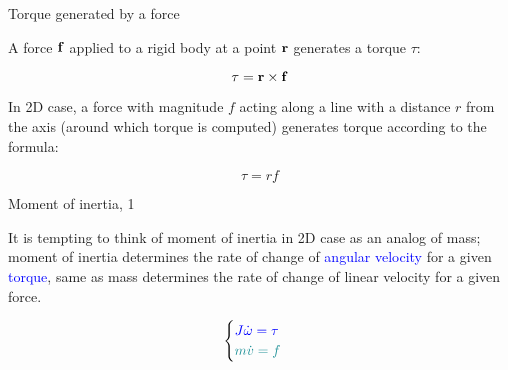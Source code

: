 \documentclass{beamer}
\begin{document}
\begin{frame}{Torque generated by a force}
	\begin{flushleft}
		
		A force $\mathbf{f}$ applied to a rigid body at a point $\mathbf{r}$ generates a torque $\tau$:
		
		\begin{equation}
			\tau = \mathbf{r} \times \mathbf{f}
		\end{equation}	
		
		In 2D case, a force with magnitude $f$ acting along a line with a distance $r$ from the axis (around which torque is computed) generates torque according to the formula:
		
		\begin{equation}
			\tau = r f
		\end{equation}	
		
	\end{flushleft}
\end{frame}


\begin{frame}{Moment of inertia, 1}
\begin{flushleft}
	
	 It is tempting to think of moment of inertia in 2D case as an analog of mass; moment of inertia determines the rate of change of \textcolor{blue}{angular velocity} for a given \textcolor{blue}{torque}, same as mass determines the rate of change of \textcolor{mydarkturquoise}{linear velocity} for a given \textcolor{mydarkturquoise}{force}.
	 
	 \begin{equation*}
		\begin{cases}
			\textcolor{blue}{J \dot \omega =  \tau}  \\
			\textcolor{mydarkturquoise}{m \dot v = f}
	\end{cases}
\end{equation*}
	 
	
\end{flushleft}
\end{frame}
\end{document}
